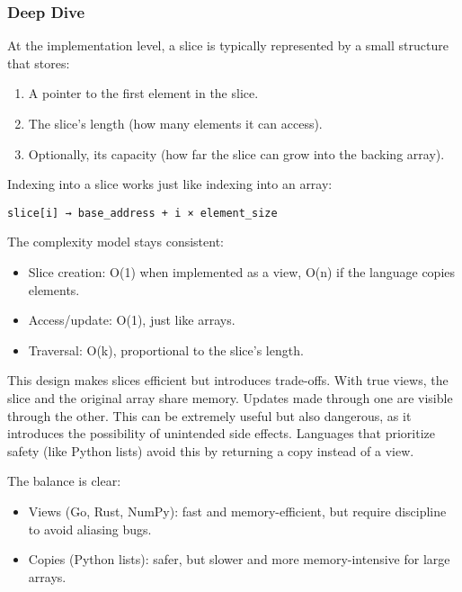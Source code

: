 \documentclass[
  letterpaper,
  DIV=11,
  numbers=noendperiod]{scrreprt}
\providecommand{\tightlist}{%
  \setlength{\itemsep}{0pt}\setlength{\parskip}{0pt}}
\begin{document}
\subsubsection{Deep Dive}\label{deep-dive-10}

At the implementation level, a slice is typically represented by a small
structure that stores:

\begin{enumerate}
\def\labelenumi{\arabic{enumi}.}
\tightlist
\item
  A pointer to the first element in the slice.
\item
  The slice's length (how many elements it can access).
\item
  Optionally, its capacity (how far the slice can grow into the backing
  array).
\end{enumerate}

Indexing into a slice works just like indexing into an array:

\begin{verbatim}
slice[i] → base_address + i × element_size
\end{verbatim}

The complexity model stays consistent:

\begin{itemize}
\tightlist
\item
  Slice creation: O(1) when implemented as a view, O(n) if the language
  copies elements.
\item
  Access/update: O(1), just like arrays.
\item
  Traversal: O(k), proportional to the slice's length.
\end{itemize}

This design makes slices efficient but introduces trade-offs. With true
views, the slice and the original array share memory. Updates made
through one are visible through the other. This can be extremely useful
but also dangerous, as it introduces the possibility of unintended side
effects. Languages that prioritize safety (like Python lists) avoid this
by returning a copy instead of a view.

The balance is clear:

\begin{itemize}
\tightlist
\item
  Views (Go, Rust, NumPy): fast and memory-efficient, but require
  discipline to avoid aliasing bugs.
\item
  Copies (Python lists): safer, but slower and more memory-intensive for
  large arrays.
\end{itemize}
\end{document}
